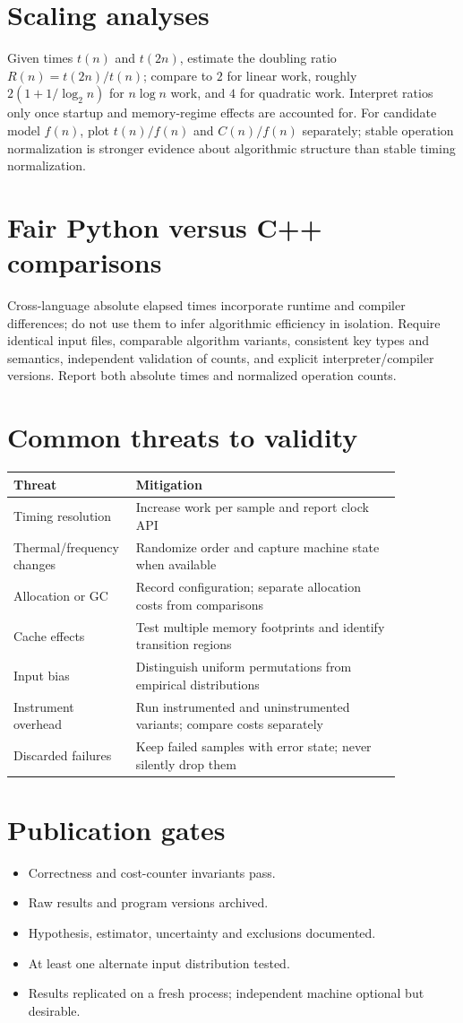 \documentclass[11pt]{article}
\begin{document}
\section{Scaling analyses}
Given times $t(n)$ and $t(2n)$, estimate the doubling ratio $R(n)=t(2n)/t(n)$; compare to $2$ for linear work, roughly $2(1+1/\log_2 n)$ for $n\log n$ work, and $4$ for quadratic work. Interpret ratios only once startup and memory-regime effects are accounted for. For candidate model $f(n)$, plot $t(n)/f(n)$ and $C(n)/f(n)$ separately; stable operation normalization is stronger evidence about algorithmic structure than stable timing normalization.
\section{Fair Python versus C++ comparisons}
Cross-language absolute elapsed times incorporate runtime and compiler differences; do not use them to infer algorithmic efficiency in isolation. Require identical input files, comparable algorithm variants, consistent key types and semantics, independent validation of counts, and explicit interpreter/compiler versions. Report both absolute times and normalized operation counts.
\section{Common threats to validity}
\begin{longtable}{p{0.21\linewidth}p{0.65\linewidth}}\toprule Threat & Mitigation \\ \midrule
Timing resolution & Increase work per sample and report clock API \\
Thermal/frequency changes & Randomize order and capture machine state when available \\
Allocation or GC & Record configuration; separate allocation costs from comparisons \\
Cache effects & Test multiple memory footprints and identify transition regions \\
Input bias & Distinguish uniform permutations from empirical distributions \\
Instrument overhead & Run instrumented and uninstrumented variants; compare costs separately \\
Discarded failures & Keep failed samples with error state; never silently drop them \\
\bottomrule\end{longtable}
\section{Publication gates}
\begin{itemize}\item Correctness and cost-counter invariants pass. \item Raw results and program versions archived. \item Hypothesis, estimator, uncertainty and exclusions documented. \item At least one alternate input distribution tested. \item Results replicated on a fresh process; independent machine optional but desirable.\end{itemize}
\end{document}
